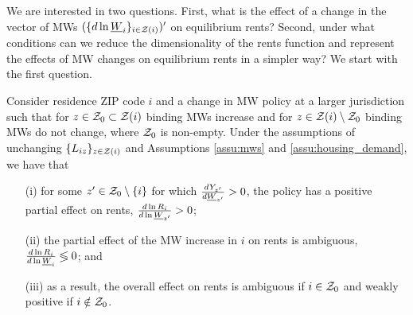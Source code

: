 We are interested in two questions.
First, what is the effect of a change in the vector of MWs 
$(\{d \ln \underline{W}_i\}_{i\in\mathcal{Z}(i)})'$ on equilibrium rents?
Second, under what conditions can we reduce the dimensionality of the rents 
function and represent the effects of MW changes on equilibrium rents in a 
simpler way?
We start with the first question.

\begin{prop}\label{prop:comparative_statics}
    Consider residence ZIP code $i$ and a change in MW policy at a larger
    jurisdiction such that for $z\in\mathcal{Z}_0 \subset \mathcal{Z}(i)$ binding MWs increase 
    and for $z\in\mathcal{Z}(i)\setminus \mathcal{Z}_0$ binding MWs do not change,
    where $\mathcal{Z}_0$ is non-empty.
    Under the assumptions of unchanging $\{L_{iz}\}_{z\in\mathcal{Z}(i)}$ 
    and Assumptions \ref{assu:mws} and \ref{assu:housing_demand},
    we have that
    \begin{enumerate}
        \item[(i)]
        for some $z'\in\mathcal{Z}_0\setminus\{i\}$ for which $\frac{d Y_{z'}}{d \underline{W}_{z'}}>0$, 
        the policy has a positive partial effect on rents, 
        $\frac{d\ln R_i}{d\ln\underline{W}_{z'}} > 0$;
        \item[(ii)]
        the partial effect of the MW increase in $i$ on rents is ambiguous, 
        $\frac{d\ln R_i}{d\ln\underline{W}_i} \lessgtr 0$; and
        \item[(iii)]
        as a result, the overall effect on rents is ambiguous if $i\in\mathcal{Z}_0$ 
        and weakly positive if $i\notin\mathcal{Z}_0$.
    \end{enumerate}
\end{prop}

